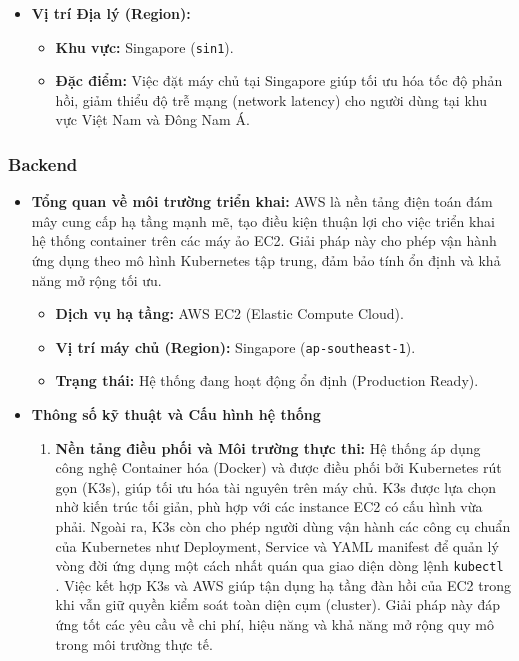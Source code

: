 \begin{itemize}
\begin{itemize}
		\item \textbf{Vị trí Địa lý (Region):}
		\begin{itemize}
			\item \textbf{Khu vực:} Singapore (\texttt{sin1}).
			\item \textbf{Đặc điểm:} Việc đặt máy chủ tại Singapore giúp tối ưu hóa tốc độ phản hồi, giảm thiểu độ trễ mạng (network latency) cho người dùng tại khu vực Việt Nam và Đông Nam Á.
		\end{itemize}
	\end{itemize}
\end{itemize}

\subsubsection{Backend}
\begin{itemize}
	\item \textbf{Tổng quan về môi trường triển khai:}
	AWS là nền tảng điện toán đám mây cung cấp hạ tầng mạnh mẽ, tạo điều kiện thuận lợi cho việc triển khai hệ thống container trên các máy ảo EC2. Giải pháp này cho phép vận hành ứng dụng theo mô hình Kubernetes tập trung, đảm bảo tính ổn định và khả năng mở rộng tối ưu.

	
	\begin{itemize}
		\item \textbf{Dịch vụ hạ tầng:} AWS EC2 (Elastic Compute Cloud).
		\item \textbf{Vị trí máy chủ (Region):} Singapore (\texttt{ap-southeast-1}).
		\item \textbf{Trạng thái:} Hệ thống đang hoạt động ổn định (Production Ready).
	\end{itemize}
	
	\item \textbf{Thông số kỹ thuật và Cấu hình hệ thống}
	
	\begin{enumerate}
		\item \textbf{Nền tảng điều phối và Môi trường thực thi:}
		Hệ thống áp dụng công nghệ Container hóa (Docker) và được điều phối bởi Kubernetes rút gọn (K3s), giúp tối ưu hóa tài nguyên trên máy chủ. K3s được lựa chọn nhờ kiến trúc tối giản, phù hợp với các instance EC2 có cấu hình vừa phải. Ngoài ra, K3s còn cho phép người dùng vận hành các công cụ chuẩn của Kubernetes như Deployment, Service và YAML manifest để quản lý vòng đời ứng dụng một cách nhất quán qua giao diện dòng lệnh \texttt{kubectl} \cite{k3s}.  Việc kết hợp K3s và AWS giúp tận dụng hạ tầng đàn hồi của EC2 trong khi vẫn giữ quyền kiểm soát toàn diện cụm (cluster). Giải pháp này đáp ứng tốt các yêu cầu về chi phí, hiệu năng và khả năng mở rộng quy mô trong môi trường thực tế.
		

\end{enumerate}
\end{itemize}
